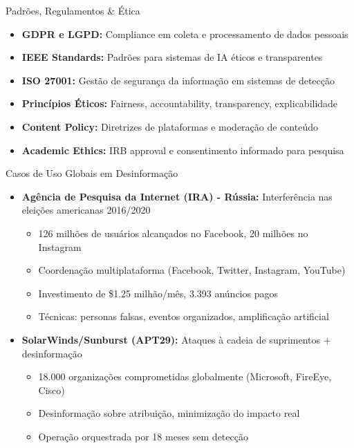 \documentclass[aspectratio=169,xcolor=table]{beamer}
\begin{document}
\begin{frame}{Padrões, Regulamentos \& Ética}
    \begin{itemize}
        \item \textbf{GDPR e LGPD:} Compliance em coleta e processamento de dados pessoais
        \item \textbf{IEEE Standards:} Padrões para sistemas de IA éticos e transparentes
        \item \textbf{ISO 27001:} Gestão de segurança da informação em sistemas de detecção
        \item \textbf{Princípios Éticos:} Fairness, accountability, transparency, explicabilidade
        \item \textbf{Content Policy:} Diretrizes de plataformas e moderação de conteúdo
        \item \textbf{Academic Ethics:} IRB approval e consentimento informado para pesquisa
    \end{itemize}
\end{frame}

\begin{frame}{Casos de Uso Globais em Desinformação}
    \begin{itemize}
        \item \textbf{Agência de Pesquisa da Internet (IRA) - Rússia:} Interferência nas eleições americanas 2016/2020
        \begin{itemize}
            \item 126 milhões de usuários alcançados no Facebook, 20 milhões no Instagram
            \item Coordenação multiplataforma (Facebook, Twitter, Instagram, YouTube)
            \item Investimento de \$1.25 milhão/mês, 3.393 anúncios pagos
            \item Técnicas: personas falsas, eventos organizados, amplificação artificial
        \end{itemize}
        \item \textbf{SolarWinds/Sunburst (APT29):} Ataques à cadeia de suprimentos + desinformação
        \begin{itemize}
            \item 18.000 organizações comprometidas globalmente (Microsoft, FireEye, Cisco)
            \item Desinformação sobre atribuição, minimização do impacto real
            \item Operação orquestrada por 18 meses sem detecção
        \end{itemize}
    \end{itemize}
\end{frame}
\end{document}
